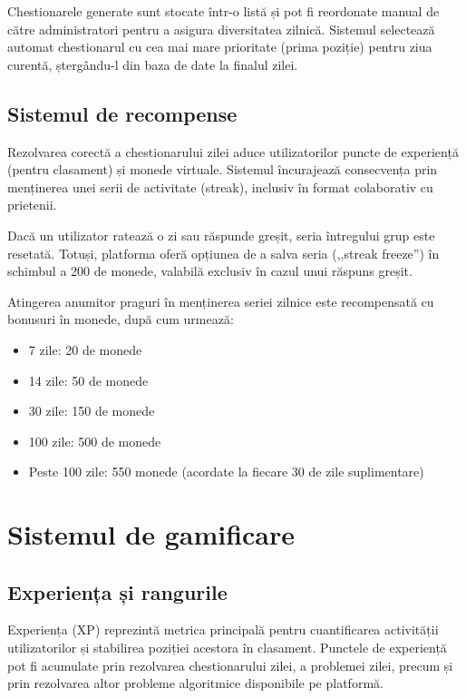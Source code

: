 Chestionarele generate sunt stocate într-o listă și pot fi reordonate manual de către administratori pentru a asigura diversitatea zilnică. Sistemul selectează automat chestionarul cu cea mai mare prioritate (prima poziție) pentru ziua curentă, ștergându-l din baza de date la finalul zilei.

\subsection{Sistemul de recompense}

Rezolvarea corectă a chestionarului zilei aduce utilizatorilor puncte de experiență (pentru clasament) și monede virtuale. Sistemul încurajează consecvența prin menținerea unei serii de activitate (streak), inclusiv în format colaborativ cu prietenii. 

Dacă un utilizator ratează o zi sau răspunde greșit, seria întregului grup este resetată. Totuși, platforma oferă opțiunea de a salva seria (,,streak freeze'') în schimbul a 200 de monede, valabilă exclusiv în cazul unui răspuns greșit. 

Atingerea anumitor praguri în menținerea seriei zilnice este recompensată cu bonusuri în monede, după cum urmează:

\begin{itemize}
    \item 7 zile: 20 de monede
    \item 14 zile: 50 de monede
    \item 30 zile: 150 de monede
    \item 100 zile: 500 de monede
    \item Peste 100 zile: 550 monede (acordate la fiecare 30 de zile suplimentare)
\end{itemize}

\section{Sistemul de gamificare}

\subsection{Experiența și rangurile}

Experiența (XP) reprezintă metrica principală pentru cuantificarea activității utilizatorilor și stabilirea poziției acestora în clasament. Punctele de experiență pot fi acumulate prin rezolvarea chestionarului zilei, a problemei zilei, precum și prin rezolvarea altor probleme algoritmice disponibile pe platformă. 

